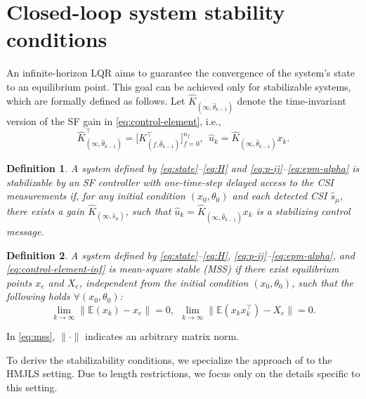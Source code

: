 \documentclass[journal,twoside,web]{ieeecolor}
\newtheorem{definition}{Definition}
\begin{document}
\section{Closed-loop system stability conditions}\label{sec:stability}
An infinite-horizon LQR aims to guarantee the convergence of the system's state to an equilibrium point. This goal can be achieved only for stabilizable systems, which are formally defined as follows. Let $\hat{K}_{(\infty,\hat{\theta}_{k-1})}$ denote the time-invariant version of the SF gain in \eqref{eq:control-element}, i.e.,
\begin{equation}\label{eq:control-element-inf}
	\hat{K}_{(\infty,\hat{\theta}_{k-1})}^{\top} = \big[K_{(f,\hat{\theta}_{k-1})}^{\top}\big]_{f=0}^{n_f},~~
    \hat{u}_{k}=\hat{K}_{(\infty,\hat{\theta}_{k-1})}x_k.
\end{equation}
\begin{definition}\label{def:stabiliz} 
A system defined by \eqref{eq:state}–\eqref{eq:H} and \eqref{eq:p-ij}–\eqref{eq:epm-alpha} is stabilizable by %
an SF controller with one-time-step delayed access to the CSI measurements 
if, for any initial condition $(x_0,\theta_0)$ and each detected CSI $\hat{s}_{\mu}$, there exists a gain $\hat{K}_{(\infty,\hat{s}_{\mu})}$, such that  $\hat{u}_{k}=\hat{K}_{(\infty,\hat{\theta}_{k-1})}x_k$ is a stabilizing control message. %
\end{definition}
\begin{definition}\label{def:mss}
A system defined by \eqref{eq:state}–\eqref{eq:H}, \eqref{eq:p-ij}–\eqref{eq:epm-alpha}, and \eqref{eq:control-element-inf}
is mean-square stable (MSS) if there exist equilibrium points $x_{e}$ and $X_{e}$, independent from the initial condition $(x_0,\theta_0)$, such that the following holds $\forall (x_0,\theta_0)$:
\begin{equation}\label{eq:mss}
        \lim_{k \to \infty} \|\mathbb{E} (x_k)-x_{e} \| = 0,~~
        \lim_{k \to \infty} \|\mathbb{E} (x_k x_k^{\top} )-X_{e}\| = 0.
\end{equation}
\end{definition}
In \eqref{eq:mss}, $\|\cdot\|$ indicates an arbitrary matrix norm.

To derive the stabilizability conditions, we specialize the approach of \cite[Sec. 5]{yZL-2025-automatica} to the HMJLS setting. Due to length restrictions, we focus only on the details specific to this setting.
\end{document}
